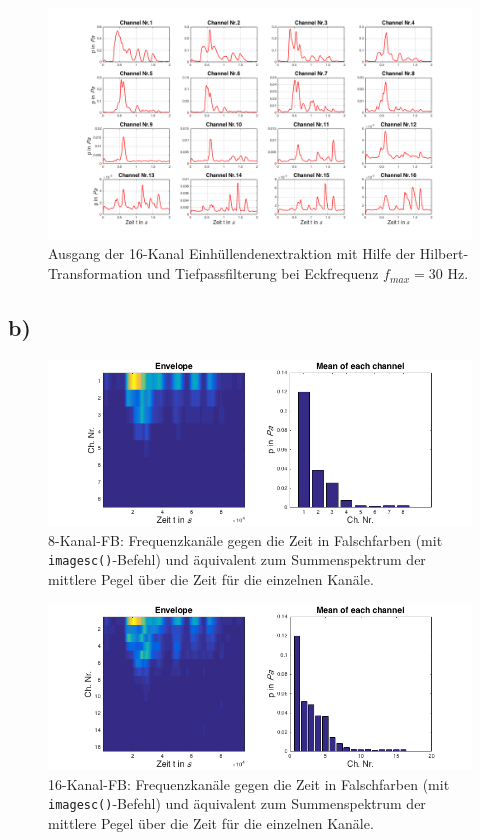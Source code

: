 \documentclass[
a4paper, 
12pt, 
]{article}
\begin{document}
\begin{figure}[h]
\centering
\includegraphics[width=1\linewidth]{Plots/a1_16ch}
\caption{Ausgang der 16-Kanal Einhüllendenextraktion mit Hilfe der Hilbert-Transformation und Tiefpassfilterung bei Eckfrequenz $f_{max}=30$ Hz.}
\label{fig:a1_16ch}
\end{figure}

\clearpage

\subsection*{b)}
\begin{figure}[h]
\centering
\includegraphics[width=0.9\linewidth]{Plots/b1_8ch}
\caption{8-Kanal-FB: Frequenzkanäle gegen die Zeit in Falschfarben (mit \texttt{imagesc()}-Befehl) und äquivalent zum Summenspektrum der mittlere Pegel über die Zeit für die einzelnen Kanäle.}
\label{fig:b1_8ch}
\end{figure}


\begin{figure}[h]
\centering
\includegraphics[width=0.9\linewidth]{Plots/b1_16ch}
\caption{16-Kanal-FB: Frequenzkanäle gegen die Zeit in Falschfarben (mit \texttt{imagesc()}-Befehl) und äquivalent zum Summenspektrum der mittlere Pegel über die Zeit für die einzelnen Kanäle.}
\label{fig:b1_16ch}
\end{figure}
\end{document}
